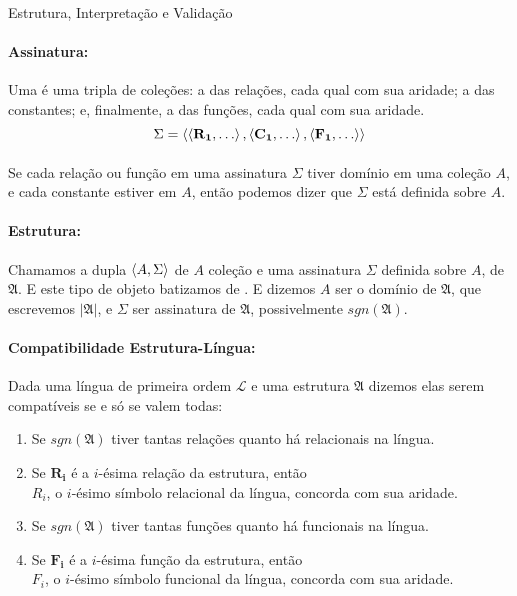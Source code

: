     \begin{definition}{Estrutura, Interpretação e Validação}
        \paragraph{Assinatura:}
            Uma  é uma tripla de coleções: a das 
            relações, cada qual com sua aridade; 
            a das constantes; e, finalmente, a das funções, 
            cada qual com sua aridade.
        $$\Sigma=\TUPLE{
            \TUPLE{
                \mathbf{R_1}
            }{
                \ldots}
        }{
            \TUPLE{
                \mathbf{C_1}
            }{
                \ldots
        }}{
            \TUPLE{
                \mathbf{F_1}
            }{
                \ldots
        }}$$
        \paragraph{}
            Se cada relação ou função em uma assinatura $\Sigma$ 
            tiver domínio em uma coleção $A$, e cada constante 
            estiver em $A$, então podemos dizer que $\Sigma$ está 
            definida sobre $A$. 

        \paragraph{Estrutura:}
            Chamamos a dupla $\TUPLE{A}{\Sigma}$ de $A$ coleção e uma assinatura 
            $\Sigma$ definida sobre $A$, de $\mathfrak{A}$. E este tipo de objeto batizamos de . 
            E dizemos $A$ ser o domínio de $\mathfrak{A}$, que escrevemos $|\mathfrak{A}|$, 
            e $\Sigma$ ser assinatura de $\mathfrak{A}$, possivelmente $sgn(\mathfrak{A})$.

        \paragraph{Compatibilidade Estrutura-Língua:}
            Dada uma língua de primeira ordem $\mathcal{L}$ e uma estrutura $\mathfrak{A}$ 
            dizemos elas serem compatíveis se e só se valem todas:
            \begin{enumerate}[label=(\alph*)]
                \item Se $sgn(\mathfrak{A})$ tiver tantas relações quanto há relacionais na língua.
                \item Se $\mathbf{R_i}$ é a $i$-ésima relação da estrutura, então\\
                $R_i$, o $i$-ésimo símbolo relacional da língua, concorda com sua 
                aridade.
                \item Se $sgn(\mathfrak{A})$ tiver tantas  funções quanto há funcionais  na língua.
                \item Se $\mathbf{F_i}$ é a $i$-ésima função da estrutura, então\\
                    $F_i$, o $i$-ésimo símbolo funcional da língua, concorda com sua 
                    aridade.
            \end{enumerate}
        

\end{definition}
